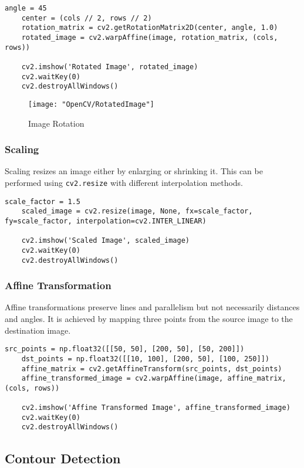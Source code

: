 \begin{lstlisting}[caption=Rotation]
	angle = 45
	center = (cols // 2, rows // 2)
	rotation_matrix = cv2.getRotationMatrix2D(center, angle, 1.0)
	rotated_image = cv2.warpAffine(image, rotation_matrix, (cols, rows))
	
	cv2.imshow('Rotated Image', rotated_image)
	cv2.waitKey(0)
	cv2.destroyAllWindows()
\end{lstlisting}

\begin{figure}[h]
	\centering
	\texttt{[image: "OpenCV/RotatedImage"]}
	\caption{Image Rotation}\label{Image Rotation}
\end{figure}

\subsubsection{Scaling}
Scaling resizes an image either by enlarging or shrinking it. This can be performed using \texttt{cv2.resize} with different interpolation methods.

\begin{lstlisting}[caption=Scaling]
	scale_factor = 1.5
	scaled_image = cv2.resize(image, None, fx=scale_factor, fy=scale_factor, interpolation=cv2.INTER_LINEAR)
	
	cv2.imshow('Scaled Image', scaled_image)
	cv2.waitKey(0)
	cv2.destroyAllWindows()
\end{lstlisting}

\subsubsection{Affine Transformation}
Affine transformations preserve lines and parallelism but not necessarily distances and angles. It is achieved by mapping three points from the source image to the destination image.\cite{OpenCVTeam:2024}

\begin{lstlisting}[caption=Affine Transformation]
	src_points = np.float32([[50, 50], [200, 50], [50, 200]])
	dst_points = np.float32([[10, 100], [200, 50], [100, 250]])
	affine_matrix = cv2.getAffineTransform(src_points, dst_points)
	affine_transformed_image = cv2.warpAffine(image, affine_matrix, (cols, rows))
	
	cv2.imshow('Affine Transformed Image', affine_transformed_image)
	cv2.waitKey(0)
	cv2.destroyAllWindows()
\end{lstlisting}


\subsection{Contour Detection}

